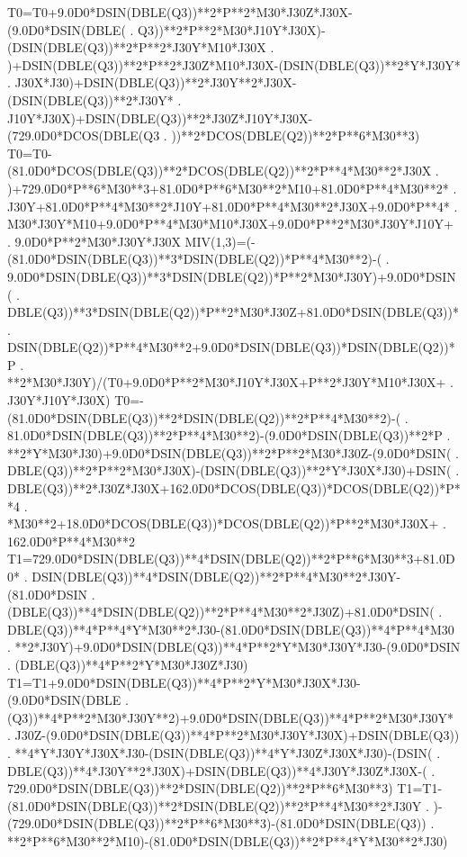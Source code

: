 \begin{framedverbatim}
      T0=T0+9.0D0*DSIN(DBLE(Q3))**2*P**2*M30*J30Z*J30X-(9.0D0*DSIN(DBLE(
     . Q3))**2*P**2*M30*J10Y*J30X)-(DSIN(DBLE(Q3))**2*P**2*J30Y*M10*J30X
     . )+DSIN(DBLE(Q3))**2*P**2*J30Z*M10*J30X-(DSIN(DBLE(Q3))**2*Y*J30Y*
     . J30X*J30)+DSIN(DBLE(Q3))**2*J30Y**2*J30X-(DSIN(DBLE(Q3))**2*J30Y*
     . J10Y*J30X)+DSIN(DBLE(Q3))**2*J30Z*J10Y*J30X-(729.0D0*DCOS(DBLE(Q3
     . ))**2*DCOS(DBLE(Q2))**2*P**6*M30**3)
      T0=T0-(81.0D0*DCOS(DBLE(Q3))**2*DCOS(DBLE(Q2))**2*P**4*M30**2*J30X
     . )+729.0D0*P**6*M30**3+81.0D0*P**6*M30**2*M10+81.0D0*P**4*M30**2*
     . J30Y+81.0D0*P**4*M30**2*J10Y+81.0D0*P**4*M30**2*J30X+9.0D0*P**4*
     . M30*J30Y*M10+9.0D0*P**4*M30*M10*J30X+9.0D0*P**2*M30*J30Y*J10Y+
     . 9.0D0*P**2*M30*J30Y*J30X
      MIV(1,3)=(-(81.0D0*DSIN(DBLE(Q3))**3*DSIN(DBLE(Q2))*P**4*M30**2)-(
     . 9.0D0*DSIN(DBLE(Q3))**3*DSIN(DBLE(Q2))*P**2*M30*J30Y)+9.0D0*DSIN(
     . DBLE(Q3))**3*DSIN(DBLE(Q2))*P**2*M30*J30Z+81.0D0*DSIN(DBLE(Q3))*
     . DSIN(DBLE(Q2))*P**4*M30**2+9.0D0*DSIN(DBLE(Q3))*DSIN(DBLE(Q2))*P
     . **2*M30*J30Y)/(T0+9.0D0*P**2*M30*J10Y*J30X+P**2*J30Y*M10*J30X+
     . J30Y*J10Y*J30X)
      T0=-(81.0D0*DSIN(DBLE(Q3))**2*DSIN(DBLE(Q2))**2*P**4*M30**2)-(
     . 81.0D0*DSIN(DBLE(Q3))**2*P**4*M30**2)-(9.0D0*DSIN(DBLE(Q3))**2*P
     . **2*Y*M30*J30)+9.0D0*DSIN(DBLE(Q3))**2*P**2*M30*J30Z-(9.0D0*DSIN(
     . DBLE(Q3))**2*P**2*M30*J30X)-(DSIN(DBLE(Q3))**2*Y*J30X*J30)+DSIN(
     . DBLE(Q3))**2*J30Z*J30X+162.0D0*DCOS(DBLE(Q3))*DCOS(DBLE(Q2))*P**4
     . *M30**2+18.0D0*DCOS(DBLE(Q3))*DCOS(DBLE(Q2))*P**2*M30*J30X+
     . 162.0D0*P**4*M30**2
      T1=729.0D0*DSIN(DBLE(Q3))**4*DSIN(DBLE(Q2))**2*P**6*M30**3+81.0D0*
     . DSIN(DBLE(Q3))**4*DSIN(DBLE(Q2))**2*P**4*M30**2*J30Y-(81.0D0*DSIN
     . (DBLE(Q3))**4*DSIN(DBLE(Q2))**2*P**4*M30**2*J30Z)+81.0D0*DSIN(
     . DBLE(Q3))**4*P**4*Y*M30**2*J30-(81.0D0*DSIN(DBLE(Q3))**4*P**4*M30
     . **2*J30Y)+9.0D0*DSIN(DBLE(Q3))**4*P**2*Y*M30*J30Y*J30-(9.0D0*DSIN
     . (DBLE(Q3))**4*P**2*Y*M30*J30Z*J30)
      T1=T1+9.0D0*DSIN(DBLE(Q3))**4*P**2*Y*M30*J30X*J30-(9.0D0*DSIN(DBLE
     . (Q3))**4*P**2*M30*J30Y**2)+9.0D0*DSIN(DBLE(Q3))**4*P**2*M30*J30Y*
     . J30Z-(9.0D0*DSIN(DBLE(Q3))**4*P**2*M30*J30Y*J30X)+DSIN(DBLE(Q3))
     . **4*Y*J30Y*J30X*J30-(DSIN(DBLE(Q3))**4*Y*J30Z*J30X*J30)-(DSIN(
     . DBLE(Q3))**4*J30Y**2*J30X)+DSIN(DBLE(Q3))**4*J30Y*J30Z*J30X-(
     . 729.0D0*DSIN(DBLE(Q3))**2*DSIN(DBLE(Q2))**2*P**6*M30**3)
      T1=T1-(81.0D0*DSIN(DBLE(Q3))**2*DSIN(DBLE(Q2))**2*P**4*M30**2*J30Y
     . )-(729.0D0*DSIN(DBLE(Q3))**2*P**6*M30**3)-(81.0D0*DSIN(DBLE(Q3))
     . **2*P**6*M30**2*M10)-(81.0D0*DSIN(DBLE(Q3))**2*P**4*Y*M30**2*J30)

\end{framedverbatim}
